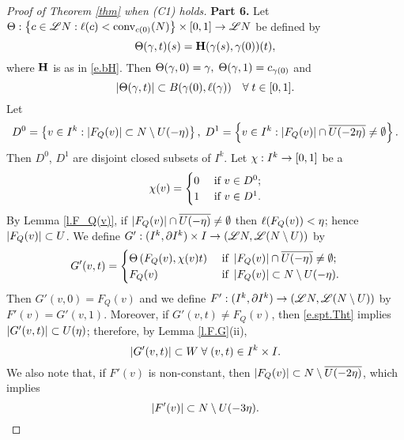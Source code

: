 \documentclass[11pt,twoside]{article}
\begin{document}
\begin{proof}[Proof of Theorem \ref{thm} when (C1) holds]
\noindent\textbf{Part 6.} Let \(\Theta:\left\{ c\in \mathscr{L} N: \ell(c)<\text{conv}_{c(0)}(N) \right\}\times [0,1]\rightarrow \mathscr{L} N\) be defined by
\[\Theta(\gamma, t)(s)=\mathbf{H}(\gamma(s), \gamma(0))(t),\]
where \(\mathbf{H}\) is as in \eqref{e.bH}. Then \(\Theta(\gamma,0)=\gamma,\;\Theta(\gamma,1)=c_{\gamma(0)}\) and 
\begin{equation}\label{e.spt.Tht}
\left|\Theta(\gamma,t)\right|\subset B(\gamma(0),\ell(\gamma))\quad \forall\;t\in [0,1].
\end{equation}
Let
\[D^0=\left\{v\in I^k:\left|F_Q(v)\right|\subset N\setminus U(-\eta)\right\},\;D^1=\left\{ v\in I^k : \left|F_Q(v)\right|\cap \overline{U(-2\eta)}\neq \emptyset \right\}.\]
Then $D^0$, \(D^1\) are disjoint closed subsets of $I^k$. Let \(\chi:I^k\rightarrow [0,1]\) be a \cts \fn \st
\begin{equation}
\chi(v)=\begin{cases}
0 &\text{ if } v\in D^0;\\
1 & \text{ if } v\in D^1.
\end{cases}
\end{equation}
By Lemma \ref{l.F_Q(v)}, if \(\left|F_Q(v)\right|\cap \overline{U(-\eta)}\neq \emptyset\) then \(\ell(F_Q(v))<\eta\); hence \(\left|F_Q(v)\right|\subset U\). We define \(G':(I^k,\partial I^k)\times I\rightarrow (\mathscr{L} N, \mathscr{L} (N\setminus U))\) by
\begin{equation}
G'(v,t)=\begin{cases}
\Theta\left(F_Q(v),\chi(v)t\right) &\text{ if } \left|F_Q(v)\right|\cap \overline{U(-\eta)}\neq \emptyset;\\
F_Q(v) &\text{ if }\left|F_Q(v)\right|\subset N\setminus U(-\eta).
\end{cases}
\end{equation}
Then \(G'(v,0)=F_Q(v)\) and we define $F': (I^k,\partial I^k) \rightarrow (\mathscr{L} N, \mathscr{L} (N\setminus U))$ by \(F'(v)=G'(v,1)\). Moreover, if \(G'(v,t)\neq F_Q(v)\), then \eqref{e.spt.Tht} implies \(\left|G'(v,t)\right|\subset U(\eta)\); therefore, by Lemma \ref{l.F.G}(ii), 
\begin{equation}\label{e.spt.G'}
\left|G'(v,t)\right|\subset W\;\forall\;(v,t)\in I^k\times I.
\end{equation} 
We also note that, if \(F'(v)\) is non-constant, then \(\left|F_Q(v)\right|\subset N\setminus \overline{U(-2\eta)}\), which implies
\begin{equation}\label{e.F'.non-cnst}
\left|F'(v)\right|\subset N\setminus U(-3\eta).
\end{equation}


\end{proof}
\end{document}
